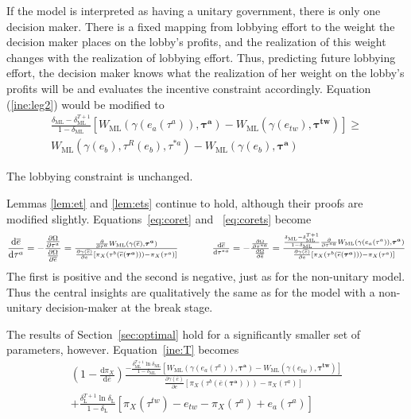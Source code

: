 \documentclass[authoryear, review]{elsarticle}
\newcommand{\ov}{\overline}
\newcommand{\bta}{\bm{\tau^a}}
\newcommand{\ga}{\gamma}
\newcommand{\btw}{\bm{\tau^{tw}}}
\newcommand{\de}{\delta}
\begin{document}
If the model is interpreted as having a unitary government, there is only one decision maker. There is a fixed mapping from lobbying effort to the weight the decision maker places on the lobby's profits, and the realization of this weight changes with the realization of lobbying effort. Thus, predicting future lobbying effort, the decision maker knows what the realization of her weight on the lobby's profits will be and evaluates the incentive constraint accordingly. Equation (\ref{ine:leg2}) would be modified to
\begin{multline}
  \frac{\de_\text{ML} - \de_\text{ML}^{T+1}}{1-\de_\text{ML}} \left[W_\text{ML}(\ga(e_a(\tau^a)),\bta) - W_{\text{ML}}(\ga(e_{tw}),\btw) \right] \geq \\
	W_{\text{ML}}(\ga(e_b),\tau^R(e_b),\tau^{*a}) - W_{\text{ML}}(\ga(e_b),\bta)
  \label{ine:leg3}
\end{multline}

The lobbying constraint is unchanged.

Lemmas \ref{lem:et} and \ref{lem:ets} continue to hold, although their proofs are modified slightly. Equations~\ref{eq:coret} and ~\ref{eq:corets} become
\begin{equation*}
 	\frac{\mathrm{d} \ov{e}}{\mathrm{d} \tau^a} = -\frac{\frac{\partial \Omega}{\partial \tau^a}}{\frac{\partial \Omega}{\partial \ov{e}}} =
	\textstyle \frac{\frac{\partial}{\partial \tau^a}W_\text{ML}(\ga(\ov{e}),\bta)}{\frac{\partial \ga(\ov{e})}{\partial e}\left[ \pi_X(\tau^b(\ov{e}(\bta))) - \pi_X(\tau^{a}) \right]} \hskip.5in 	\frac{\mathrm{d} \ov{e}}{\mathrm{d} \tau^{*a}} = -\frac{\frac{\partial \Omega}{\partial \tau^{*a}}}{\frac{\partial \Omega}{\partial \ov{e}}} = 
	\textstyle \frac{\frac{\de_\text{ML} - \de_\text{ML}^{T+1}}{1-\de_\text{ML}} \frac{\partial}{\partial \tau^{*a}}W_\text{ML}(\ga(e_a(\tau^a)),\bta)}{\frac{\partial \ga(\ov{e})}{\partial e}\left[ \pi_X(\tau^b(\ov{e}(\bta))) - \pi_X(\tau^{a}) \right]}
\end{equation*}
The first is positive and the second is negative, just as for the non-unitary model. Thus the central insights are qualitatively the same as for the model with a non-unitary decision-maker at the break stage.

The results of Section~\ref{sec:optimal} hold for a significantly smaller set of parameters, however. Equation~\ref{ine:T} becomes
\begin{multline}
 	\left(1 - \frac{\mathrm{d} \pi_X}{\mathrm{d} \ov{e}} \right) \frac{ -\frac{\de_\text{ML}^{T+1}\ln\de_\text{ML}}{1-\de_\text{ML}}\left[  W_\text{ML}(\ga(e_a(\tau^a)),\bta) - W_\text{ML}(\ga(e_{tw}),\btw) \right]}{\frac{\partial \ga(\ov{e})}{\partial e} \left[ \pi_X(\tau^b(\ov{e}(\bta))) - \pi_X(\tau^a) \right]} \\
	+  \frac{\de_\text{L}^{T+1} \ln \de_\text{L}}{1-\de_\text{L}} \left[ \pi_X(\tau^{tw}) - e_{tw} -\pi_X(\tau^a) + e_a(\tau^a) \right]
	\label{eq:uniopt}
\end{multline}
\end{document}
